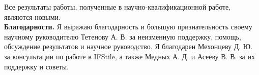 Все результаты работы, полученные в научно-квалификационной работе, являются новыми.
\\

\textbf{Благодарности.}
Я выражаю благодарность и большую признательность своему научному руководителю Тетенову А. В. за неизменную поддержку, помощь, обсуждение результатов и научное руководство.
Я благодарен Мехонцеву Д. Ю.  за консультации по работе в IFStile, а также Медных А. Д. и Асееву В. В. за их поддержку и советы.